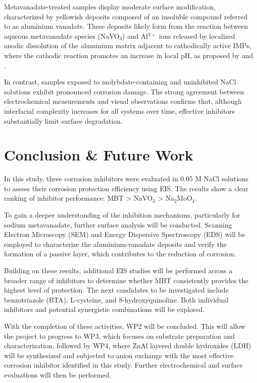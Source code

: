 \documentclass[11pt,twoside,a4paper]{report}
\begin{document}
Metavanadate-treated samples display moderate surface modification, characterized by yellowish deposits composed of an insoluble compound referred to as aluminium vanadate. These deposits likely form from the reaction between aqueous metavanadate species (NaVO$_3$) and Al$^{3+}$ ions released by localized anodic dissolution of the aluminium matrix adjacent to cathodically active IMPs, where the cathodic reaction promotes an increase in local pH, as proposed by \citet{Kharitonov2019} and \citet{Huang2024}. 

In contrast, samples exposed to molybdate-containing and uninhibited NaCl solutions exhibit pronounced corrosion damage. The strong agreement between electrochemical measurements and visual observations confirms that, although interfacial complexity increases for all systems over time, effective inhibitors substantially limit surface degradation.







\chapter{Conclusion \& Future Work}
In this study, three corrosion inhibitors were evaluated in 0.05 M NaCl solutions to assess their corrosion protection efficiency using EIS. The results show a clear ranking of inhibitor performance: MBT > NaVO$_3$ > Na$_2$MoO$_4$.

To gain a deeper understanding of the inhibition mechanisms, particularly for sodium metavanadate, further surface analysis will be conducted. Scanning Electron Microscopy (SEM) and Energy Dispersive Spectroscopy (EDS) will be employed to characterize the aluminium-vanadate deposits and verify the formation of a passive layer, which contributes to the reduction of corrosion.

Building on these results, additional EIS studies will be performed across a broader range of inhibitors to determine whether MBT consistently provides the highest level of protection. The next candidates to be investigated include benzotriazole (BTA), L-cysteine, and 8-hydroxyquinoline. Both individual inhibitors and potential synergistic combinations will be explored.

With the completion of these activities, WP2 will be concluded. This will allow the project to progress to WP3, which focuses on substrate preparation and characterization, followed by WP4, where ZnAl layered double hydroxides (LDH) will be synthesized and subjected to anion exchange with the most effective corrosion inhibitor identified in this study. Further electrochemical and surface evaluations will then be performed.
\end{document}
